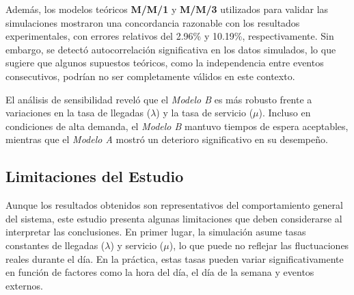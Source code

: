 \documentclass[a4paper,12pt]{article}
\begin{document}
Además, los modelos teóricos \textbf{M/M/1} y \textbf{M/M/3} utilizados para validar las simulaciones mostraron una concordancia razonable con los resultados experimentales, con errores relativos del 2.96\% y 10.19\%, respectivamente. Sin embargo, se detectó autocorrelación significativa en los datos simulados, lo que sugiere que algunos supuestos teóricos, como la independencia entre eventos consecutivos, podrían no ser completamente válidos en este contexto.

El análisis de sensibilidad reveló que el \textit{Modelo B} es más robusto frente a variaciones en la tasa de llegadas (\( \lambda \)) y la tasa de servicio (\( \mu \)). Incluso en condiciones de alta demanda, el \textit{Modelo B} mantuvo tiempos de espera aceptables, mientras que el \textit{Modelo A} mostró un deterioro significativo en su desempeño.

\subsection{Limitaciones del Estudio}

Aunque los resultados obtenidos son representativos del comportamiento general del sistema, este estudio presenta algunas limitaciones que deben considerarse al interpretar las conclusiones. En primer lugar, la simulación asume tasas constantes de llegadas (\( \lambda \)) y servicio (\( \mu \)), lo que puede no reflejar las fluctuaciones reales durante el día. En la práctica, estas tasas pueden variar significativamente en función de factores como la hora del día, el día de la semana y eventos externos.
\end{document}
